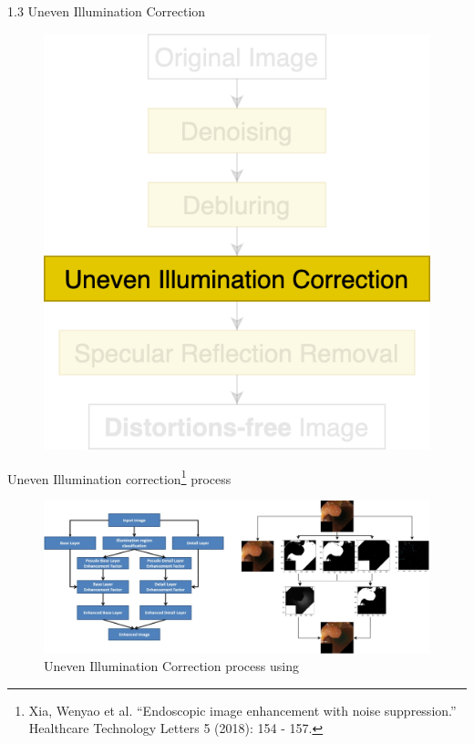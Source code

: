 \documentclass{libs/ufc_format}
\begin{document}
\begin{frame}{ 1.3 Uneven Illumination Correction}
    \begin{figure}
        \includegraphics[scale=0.25]{libs/stage1.3.png}
    \end{figure}
\end{frame}
\begin{frame}{\small Uneven Illumination correction\footnote[frame]{\tiny Xia, Wenyao et al. “Endoscopic image enhancement with noise suppression.” Healthcare Technology Letters 5 (2018): 154 - 157.} process}

    \begin{figure}
        \centering
        \includegraphics[width=1\textwidth]{libs/illres.png}
        \caption{Uneven Illumination Correction process using \cite{Xia2018EndoscopicIE}}
        \label{uneven_illumination_correction}
    \end{figure}
\end{frame}
\end{document}
